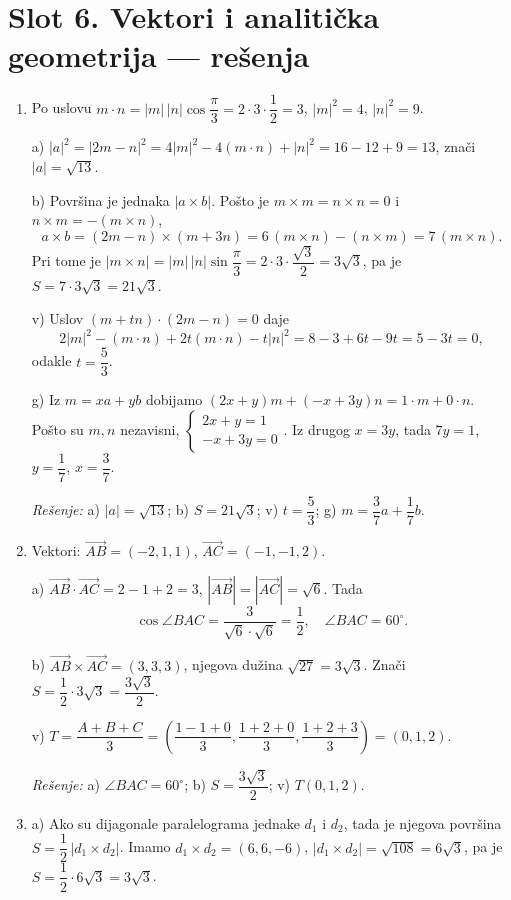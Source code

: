 \section*{Slot 6. Vektori i analitička geometrija — rešenja}
\begin{enumerate}[label=\arabic*.]

\item Po uslovu $m\cdot n=|m|\,|n|\cos\dfrac{\pi}{3}=2\cdot 3\cdot\dfrac12=3$, $|m|^2=4$, $|n|^2=9$.

a) $|a|^2=|2m-n|^2=4|m|^2-4(m\cdot n)+|n|^2=16-12+9=13$, znači $|a|=\sqrt{13}$.

b) Površina je jednaka $|a\times b|$. Pošto je $m\times m=n\times n=0$ i $n\times m=-(m\times n)$,
\[a\times b=(2m-n)\times(m+3n)=6\,(m\times n)-(n\times m)=7\,(m\times n).\]
Pri tome je $|m\times n|=|m|\,|n|\sin\dfrac{\pi}{3}=2\cdot3\cdot\dfrac{\sqrt3}{2}=3\sqrt3$, pa je $S=7\cdot 3\sqrt3=21\sqrt3$.

v) Uslov $(m+tn)\cdot(2m-n)=0$ daje
\[2|m|^2-(m\cdot n)+2t(m\cdot n)-t|n|^2=8-3+6t-9t=5-3t=0,\]
odakle $t=\dfrac{5}{3}$.

g) Iz $m=xa+yb$ dobijamo $(2x+y)m+(-x+3y)n=1\cdot m+0\cdot n$. Pošto su $m,n$ nezavisni, $\begin{cases}2x+y=1\\ -x+3y=0\end{cases}$. Iz drugog $x=3y$, tada $7y=1$, $y=\dfrac17$, $x=\dfrac37$.

\textit{Rešenje:} a) $|a|=\sqrt{13}$; b) $S=21\sqrt3$; v) $t=\dfrac{5}{3}$; g) $m=\dfrac37a+\dfrac17b$.

\item Vektori: $\overrightarrow{AB}=(-2,1,1)$, $\overrightarrow{AC}=(-1,-1,2)$.

a) $\overrightarrow{AB}\cdot\overrightarrow{AC}=2-1+2=3$, $|\overrightarrow{AB}|=|\overrightarrow{AC}|=\sqrt6$. Tada
\[\cos\angle BAC=\dfrac{3}{\sqrt6\cdot\sqrt6}=\dfrac12,\quad\angle BAC=60^\circ.\]

b) $\overrightarrow{AB}\times\overrightarrow{AC}=(3,3,3)$, njegova dužina $\sqrt{27}=3\sqrt3$. Znači $S=\dfrac12\cdot 3\sqrt3=\dfrac{3\sqrt3}{2}$.

v) $T=\dfrac{A+B+C}{3}=\left(\dfrac{1-1+0}{3},\dfrac{1+2+0}{3},\dfrac{1+2+3}{3}\right)=(0,1,2)$.

\textit{Rešenje:} a) $\angle BAC=60^\circ$; b) $S=\dfrac{3\sqrt3}{2}$; v) $T(0,1,2)$.

\item a) Ako su dijagonale paralelograma jednake $d_1$ i $d_2$, tada je njegova površina $S=\dfrac12\,|d_1\times d_2|$. Imamo $d_1\times d_2=(6,6,-6)$, $|d_1\times d_2|=\sqrt{108}=6\sqrt3$, pa je $S=\dfrac12\cdot 6\sqrt3=3\sqrt3$.


\end{enumerate}
